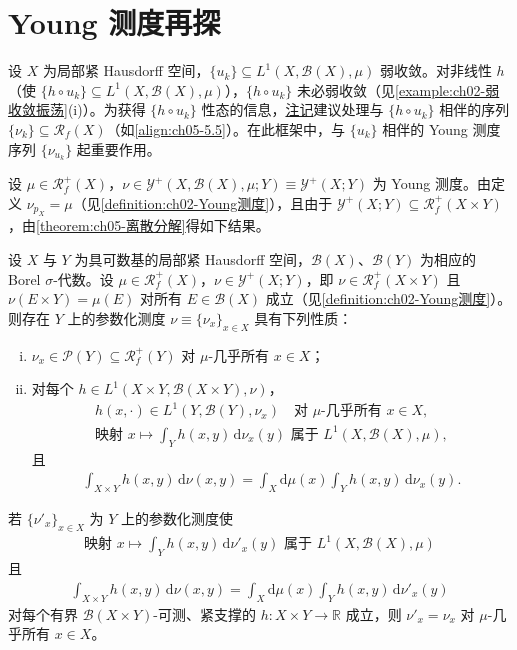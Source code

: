 \documentclass[../../main.tex]{subfiles}%
\begin{document}
\section{Young 测度再探}\label{section:ch05-Young再探}

设 $X$ 为局部紧 Hausdorff 空间，$\{u_k\}\subseteq L^1(X,\mathscr{B}(X),\mu)$ 弱收敛。对非线性 $h$（使 $\{h\circ u_k\}\subseteq L^1(X,\mathscr{B}(X),\mu)$），$\{h\circ u_k\}$ 未必弱收敛（见\cref{example:ch02-弱收敛振荡}(i)）。为获得 $\{h\circ u_k\}$ 性态的信息，\hyperref[remark:ch05-函数转测度]{注记}建议处理与 $\{h\circ u_k\}$ 相伴的序列 $\{\nu_k\}\subseteq\mathscr{R}_f(X)$（如\eqref{align:ch05-5.5}）。在此框架中，与 $\{u_k\}$ 相伴的 Young 测度序列 $\{\nu_{u_k}\}$ 起重要作用。

设 $\mu\in\mathscr{R}^+_f(X)$，$\nu\in\mathcal{Y}^+(X,\mathscr{B}(X),\mu;Y)\equiv\mathcal{Y}^+(X;Y)$ 为 Young 测度。由定义 $\nu_{p_X}=\mu$（见\cref{definition:ch02-Young测度}），且由于 $\mathcal{Y}^+(X;Y)\subseteq\mathscr{R}^+_f(X\times Y)$，由\cref{theorem:ch05-离散分解}得如下结果。

\begin{proposition}\label{proposition:ch05-离散分解}
设 $X$ 与 $Y$ 为具可数基的局部紧 Hausdorff 空间，$\mathscr{B}(X)$、$\mathscr{B}(Y)$ 为相应的 Borel $\sigma$-代数。设 $\mu\in\mathscr{R}^+_f(X)$，$\nu\in\mathcal{Y}^+(X;Y)$，即 $\nu\in\mathscr{R}^+_f(X\times Y)$ 且 $\nu(E\times Y)=\mu(E)$ 对所有 $E\in\mathscr{B}(X)$ 成立（见\cref{definition:ch02-Young测度}）。则存在 $Y$ 上的参数化测度 $\nu\equiv\{\nu_x\}_{x\in X}$ 具有下列性质：
\begin{enumerate}[(i)]
\item\label{item:ch05-youdis-i} $\nu_x\in\mathcal{P}(Y)\subseteq\mathscr{R}^+_f(Y)$ 对 $\mu$-几乎所有 $x\in X$；
\item\label{item:ch05-youdis-ii} 对每个 $h\in L^1(X\times Y,\mathscr{B}(X\times Y),\nu)$，
\begin{align}
h(x,\cdot)\in L^1(Y,\mathscr{B}(Y),\nu_x)
\quad\text{对 }\mu\text{-几乎所有 }x\in X,\label{align:ch05-5.48}\\
\text{映射 }x\mapsto\int_Y h(x,y)\,\mathrm{d}\nu_x(y)
\text{ 属于 }L^1(X,\mathscr{B}(X),\mu),\label{align:ch05-5.49}
\end{align}
且
\begin{align}
\int_{X\times Y}h(x,y)\,\mathrm{d}\nu(x,y)
=\int_X\mathrm{d}\mu(x)\int_Y h(x,y)\,\mathrm{d}\nu_x(y).\label{align:ch05-5.50}
\end{align}
\end{enumerate}
若 $\{\nu'_x\}_{x\in X}$ 为 $Y$ 上的参数化测度使
\begin{align}
\text{映射 }x\mapsto\int_Y h(x,y)\,\mathrm{d}\nu'_x(y)
\text{ 属于 }L^1(X,\mathscr{B}(X),\mu)\label{align:ch05-5.51}
\end{align}
且
\begin{align}
\int_{X\times Y}h(x,y)\,\mathrm{d}\nu(x,y)
=\int_X\mathrm{d}\mu(x)\int_Y h(x,y)\,\mathrm{d}\nu'_x(y)\label{align:ch05-5.52}
\end{align}
对每个有界 $\mathscr{B}(X\times Y)$-可测、紧支撑的 $h:X\times Y\to\mathbb{R}$ 成立，则 $\nu'_x=\nu_x$ 对 $\mu$-几乎所有 $x\in X$。
\end{proposition}
\end{document}
